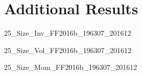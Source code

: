 
\section{Additional Results} \label{sec:addl_results}

{25_Size_Inv_FF2016b_196307_201612}

{25_Size_Vol_FF2016b_196307_201612}

{25_Size_Mom_FF2016b_196307_201612}

